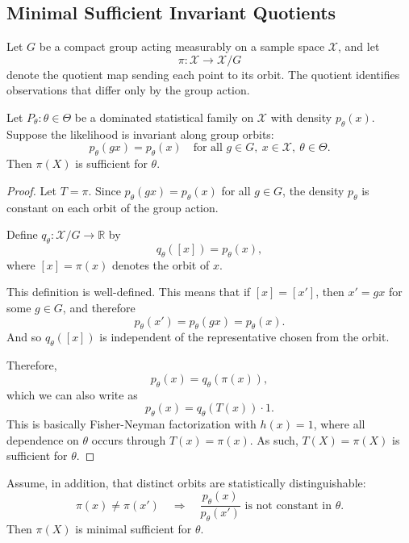 \documentclass{ssl}
\begin{document}
\subsection{Minimal Sufficient Invariant Quotients}
Let $G$ be a compact group acting measurably on a sample space $\mathcal X$, and let
$$
\pi:\mathcal X\to \mathcal X/G
$$
denote the quotient map sending each point to its orbit. The quotient identifies observations that differ only by the group action.

\begin{theorem}
Let ${P_\theta:\theta\in\Theta}$ be a dominated statistical family on $\mathcal X$ with density $p_\theta(x)$. Suppose the likelihood is invariant along group orbits:
$$
p_\theta(gx)=p_\theta(x)
\quad
\text{for all } g\in G,\ x\in\mathcal X,\ \theta\in\Theta.
$$
Then $\pi(X)$ is sufficient for $\theta$.
\end{theorem}

\begin{proof}
Let \(T=\pi\). Since \(p_\theta(gx)=p_\theta(x)\) for all \(g\in G\), the density \(p_\theta\) is constant on each orbit of the group action.

Define \(q_\theta:\mathcal X/G\to \mathbb R\) by
\[
q_\theta([x]) = p_\theta(x),
\]
where \([x]=\pi(x)\) denotes the orbit of \(x\).

This definition is well-defined. This means that if \([x]=[x']\), then \(x'=gx\) for some \(g\in G\), and therefore
\[
p_\theta(x')=p_\theta(gx)=p_\theta(x).
\]
And so \(q_\theta([x])\) is independent of the representative chosen from the orbit.

Therefore,
\[
p_\theta(x)=q_\theta(\pi(x)),
\]
which we can also write as 
\[
p_\theta(x)=q_\theta(T(x))\cdot 1.
\]
This is basically Fisher-Neyman factorization with \(h(x)=1\), where all dependence on \(\theta\) occurs through \(T(x)=\pi(x)\). As such, \(T(X)=\pi(X)\) is sufficient for \(\theta\).
\end{proof}

\begin{theorem}
Assume, in addition, that distinct orbits are statistically distinguishable:
$$
\pi(x)\neq \pi(x')
\quad\Longrightarrow\quad
\frac{p_\theta(x)}{p_\theta(x')}
\text{ is not constant in }\theta.
$$
Then $\pi(X)$ is minimal sufficient for $\theta$.
\end{theorem}
\end{document}
